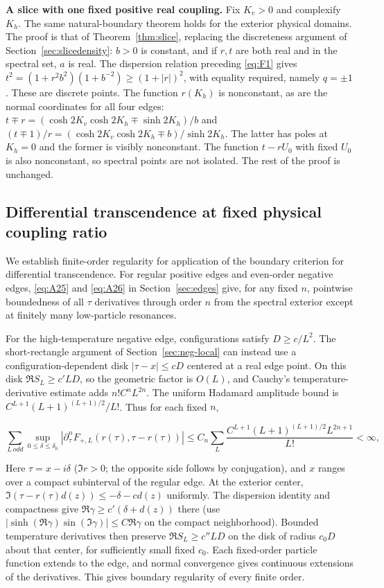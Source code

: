 \documentclass[11pt,a4paper]{article}
\numberwithin{equation}{section}
\theoremstyle{plain}
\theoremstyle{definition}
\begin{document}
\textbf{A slice with one fixed positive real coupling.} Fix \(K_v>0\) and complexify \(K_h\). The same natural-boundary theorem holds for the exterior physical domains. The proof is that of Theorem~\ref{thm:slice}, replacing the discreteness argument of Section~\ref{sec:slicedensity}: \(b>0\) is constant, and if \(r,t\) are both real and in the spectral set, \(a\) is real. The dispersion relation preceding \eqref{eq:F1} gives \(t^2=(1+r^2b^2)(1+b^{-2})\ge(1+|r|)^2\), with equality required, namely \(q=\pm1\). These are discrete points. The function \(r( K_h)\) is nonconstant, as are the normal coordinates for all four edges: \(t\mp r=(\cosh 2K_v\cosh2K_h\mp\sinh2K_h)/b\) and \((t\mp1)/r=(\cosh2K_v\cosh2K_h\mp b)/\sinh2K_h\). The latter has poles at \(K_h=0\) and the former is visibly nonconstant. The function \(t-rU_0\) with fixed \(U_0\) is also nonconstant, so spectral points are not isolated. The rest of the proof is unchanged.

\subsection{Differential transcendence at fixed physical coupling ratio}\label{sec:slicedT}

We establish finite-order regularity for application of the boundary criterion for differential transcendence. For regular positive edges and even-order negative edges, \eqref{eq:A25} and \eqref{eq:A26} in Section~\ref{sec:edges} give, for any fixed \(n\), pointwise boundedness of all \(\tau\) derivatives through order \(n\) from the spectral exterior except at finitely many low-particle resonances.

For the high-temperature negative edge, configurations satisfy \(D\ge c/L^2\). The short-rectangle argument of Section~\ref{sec:neg-local} can instead use a configuration-dependent disk \(|\tau-x|\le cD\) centered at a real edge point. On this disk \(\Re S_L\ge c' L D\), so the geometric factor is \(O(L)\), and Cauchy's temperature-derivative estimate adds \(n!C^n L^{2n}\). The uniform Hadamard amplitude bound is \(C^{L+1}(L+1)^{(L+1)/2}/L!\). Thus for each fixed \(n\),

\[\sum_{L\,odd}\sup_{0\le\delta\le\delta_0}|\partial_\tau^n F_{+,L}(r(\tau),\tau-r(\tau))|\le C_n\sum_L\frac{C^{L+1}(L+1)^{(L+1)/2}L^{2n+1}}{L!}<\infty,\]

Here \(\tau=x-i\delta\) (\(\Im r>0\); the opposite side follows by conjugation), and \(x\) ranges over a compact subinterval of the regular edge. At the exterior center, $\Im(\tau-r(\tau)d(z))\le-\delta-cd(z)$ uniformly. The dispersion identity and compactness give $\Re\gamma\ge c'(\delta+d(z))$ there (use $|\sinh(\Re\gamma)\sin(\Im\gamma)|\le C\Re\gamma$ on the compact neighborhood). Bounded temperature derivatives then preserve $\Re S_L\ge c'' LD$ on the disk of radius $c_0D$ about that center, for sufficiently small fixed $c_0$. Each fixed-order particle function extends to the edge, and normal convergence gives continuous extensions of the derivatives. This gives boundary regularity of every finite order.
\end{document}
